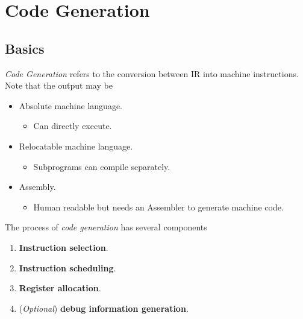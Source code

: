 \section{Code Generation}

\subsection{Basics}

\begin{definition}
    \textit{Code Generation} refers to the conversion between IR into machine instructions. Note that the output may be
    \begin{itemize}
        \item Absolute machine language.
        \begin{itemize}
            \item Can directly execute.
        \end{itemize}
        \item Relocatable machine language.
        \begin{itemize}
            \item Subprograms can compile separately.
        \end{itemize}
        \item Assembly.
        \begin{itemize}
            \item Human readable but needs an Assembler to generate machine code.
        \end{itemize}
    \end{itemize}
    
    The process of \textit{code generation} has several components
    \begin{enumerate}
        \item \textbf{Instruction selection}.
        \item \textbf{Instruction scheduling}.
        \item \textbf{Register allocation}.
        \item (\textit{Optional}) \textbf{debug information generation}.
    \end{enumerate}
\end{definition}

